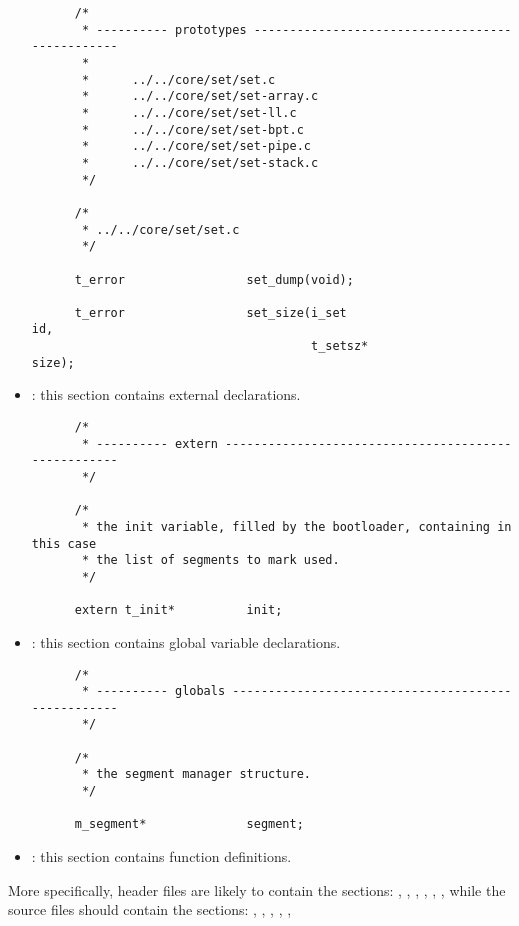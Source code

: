 \begin{itemize}
    \begin{verbatim}
      /*
       * ---------- prototypes ------------------------------------------------
       *
       *      ../../core/set/set.c
       *      ../../core/set/set-array.c
       *      ../../core/set/set-ll.c
       *      ../../core/set/set-bpt.c
       *      ../../core/set/set-pipe.c
       *      ../../core/set/set-stack.c
       */

      /*
       * ../../core/set/set.c
       */

      t_error                 set_dump(void);

      t_error                 set_size(i_set                          id,
                                       t_setsz*                       size);
    \end{verbatim}
  \item
    : this section contains external declarations.

    \begin{verbatim}
      /*
       * ---------- extern ----------------------------------------------------
       */

      /*
       * the init variable, filled by the bootloader, containing in this case
       * the list of segments to mark used.
       */

      extern t_init*          init;
    \end{verbatim}
  \item
    : this section contains global variable declarations.

    \begin{verbatim}
      /*
       * ---------- globals ---------------------------------------------------
       */

      /*
       * the segment manager structure.
       */

      m_segment*              segment;
    \end{verbatim}
  \item
    : this section contains function definitions.
\end{itemize}

More specifically,  header files are likely to contain the sections:
, , , ,
, ,  \etc{} while
the  source files should contain the sections: ,
, , , ,
 \etc{}

